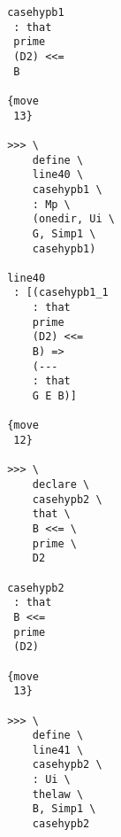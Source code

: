 \documentclass[12pt]{article}
\begin{document}
\begin{verbatim}
                                       casehypb1 
                                        : that 
                                        prime 
                                        (D2) <<= 
                                        B

                                       {move 
                                        13}

                                       >>> \
                                           define \
                                           line40 \
                                           casehypb1 \
                                           : Mp \
                                           (onedir, Ui \
                                           G, Simp1 \
                                           casehypb1)

                                       line40 
                                        : [(casehypb1_1 
                                           : that 
                                           prime 
                                           (D2) <<= 
                                           B) => 
                                           (--- 
                                           : that 
                                           G E B)]

                                       {move 
                                        12}

                                       >>> \
                                           declare \
                                           casehypb2 \
                                           that \
                                           B <<= \
                                           prime \
                                           D2

                                       casehypb2 
                                        : that 
                                        B <<= 
                                        prime 
                                        (D2)

                                       {move 
                                        13}

                                       >>> \
                                           define \
                                           line41 \
                                           casehypb2 \
                                           : Ui \
                                           thelaw \
                                           B, Simp1 \
                                           casehypb2


\end{verbatim}
\end{document}
